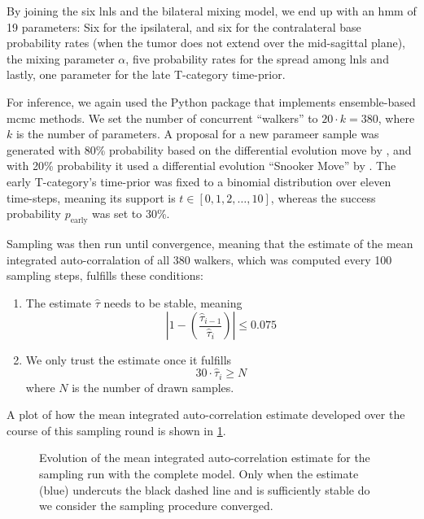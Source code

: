 \documentclass[\relativeRoot/main.tex]{subfiles}
\begin{document}
By joining the six \glspl{lnl} and the bilateral mixing model, we end up with an \gls{hmm} of 19 parameters: Six for the ipsilateral, and six for the contralateral base probability rates (when the tumor does not extend over the mid-sagittal plane), the mixing parameter $\alpha$, five probability rates for the spread among \glspl{lnl} and lastly, one parameter for the late T-category time-prior.

For inference, we again used the  Python package that implements ensemble-based \gls{mcmc} methods. We set the number of concurrent ``walkers'' to $20 \cdot k = 380$, where $k$ is the number of parameters. A proposal for a new parameer sample was generated with 80\% probability based on the differential evolution move by , and with 20\% probability it used a differential evolution ``Snooker Move'' by . The early T-category's time-prior was fixed to a binomial distribution over eleven time-steps, meaning its support is $t \in \left[0, 1, 2, \ldots, 10\right]$, whereas the success probability $p_\text{early}$ was set to 30\%.

Sampling was then run until convergence, meaning that the estimate of the mean integrated auto-corralation of all 380 walkers, which was computed every 100 sampling steps, fulfills these conditions:

\begin{enumerate}[label={(\arabic*)}]
    \item The estimate $\hat{\tau}$ needs to be stable, meaning
    \begin{equation}
        \left| 1 - \left( \frac{\hat{\tau}_{i-1}}{\hat{\tau}_i} \right) \right| \leq 0.075
    \end{equation}
    \item We only trust the estimate once it fulfills
    \begin{equation}
        30 \cdot \hat{\tau}_i \geq N
    \end{equation}
    where $N$ is the number of drawn samples.
\end{enumerate}

A plot of how the mean integrated auto-correlation estimate developed over the course of this sampling round is shown in \cref{fig:complete:acor}.

\begin{figure}
    \centering
    \def\svgwidth{0.7\textwidth}
    
    \caption[
        Mean integrated auto-correlation estimate for the complete model's run
    ]{
        Evolution of the mean integrated auto-correlation estimate for the sampling run with the complete model. Only when the estimate (blue) undercuts the black dashed line and is sufficiently stable do we consider the sampling procedure converged.
    }
    \label{fig:complete:acor}
\end{figure}
\end{document}
